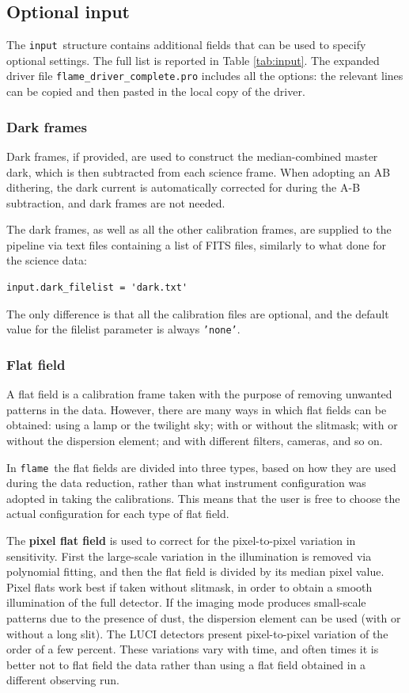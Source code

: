 \documentclass[a4paper, notitlepage]{article}
\newcommand{\flame}{\texttt{flame}}
\newcommand{\inp}{\texttt{input}}
\begin{document}
\subsection{Optional input}

The \inp\ structure contains additional fields that can be used to specify optional settings. The full list is reported in Table \ref{tab:input}. The expanded driver file \texttt{flame\_driver\_complete.pro} includes all the options: the relevant lines can be copied and then pasted in the local copy of the driver.

\subsubsection{Dark frames}
Dark frames, if provided, are used to construct the median-combined master dark, which is then subtracted from each science frame. When adopting an AB dithering, the dark current is automatically corrected for during the A-B subtraction, and dark frames are not needed.

The dark frames, as well as all the other calibration frames, are supplied to the pipeline via text files containing a list of FITS files, similarly to what done for the science data:
\begin{lstlisting}
input.dark_filelist = 'dark.txt'
\end{lstlisting}
The only difference is that all the calibration files are optional, and the default value for the filelist parameter is always \texttt{'none'}.



\subsubsection{Flat field}

A flat field is a calibration frame taken with the purpose of removing unwanted patterns in the data. However, there are many ways in which flat fields can be obtained: using a lamp or the twilight sky; with or without the slitmask; with or without the dispersion element; and with different filters, cameras, and so on.

In \flame\ the flat fields are divided into three types, based on how they are used during the data reduction, rather than what instrument configuration was adopted in taking the calibrations. This means that the user is free to choose the actual configuration for each type of flat field.

The \textbf{pixel flat field} is used to correct for the pixel-to-pixel variation in sensitivity. First the large-scale variation in the illumination is removed via polynomial fitting, and then the flat field is divided by its median pixel value. Pixel flats work best if taken without slitmask, in order to obtain a smooth illumination of the full detector. If the imaging mode produces small-scale patterns due to the presence of dust, the dispersion element can be used (with or without a long slit). The LUCI detectors present pixel-to-pixel variation of the order of a few percent. These variations vary with time, and often times it is better not to flat field the data rather than using a flat field obtained in a different observing run.
\end{document}
